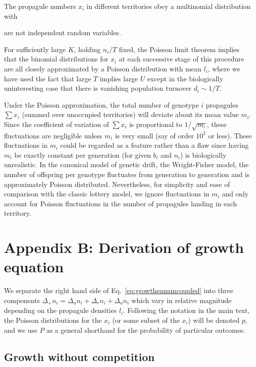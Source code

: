 \documentclass[11pt]{article}
\begin{document}
The propagule numbers $x_i$ in different territories obey a multinomial distribution with 

are not independent random variables. 



For sufficiently large $K$, holding $n_i/T$ fixed, the Poisson limit theorem implies that the binomial distributions for $x_i$ at each successive stage of this procedure are all closely approximated by a Poisson distribution with mean $l_i$, where we have used the fact that large $T$ implies large $U$ except in the biologically uninteresting case that there is vanishing population turnover $d_i \sim 1/T$. 

Under the Poisson approximation, the total number of genotype $i$ propagules $\sum x_i$ (summed over unoccupied territories) will deviate about its mean value $m_i$. Since the coefficient of variation of $\sum x_i$ is proportional to $1/\sqrt{m_i}$, these fluctuations are negligible unless $m_i$ is very small (say of order $10^2$ or less). These fluctuations in $m_i$ could be regarded as a feature rather than a flaw since having $m_i$ be exactly constant per generation (for given $b_i$ and $n_i$) is biologically unrealistic. In the canonical model of genetic drift, the Wright-Fisher model, the number of offspring per genotype fluctuates from generation to generation and is approximately Poisson distributed. Nevertheless, for simplicity and ease of comparison with the classic lottery model, we ignore fluctuations in $m_i$ and only account for Poisson fluctuations in the number of propagules landing in each territory. 

\section*{Appendix B: Derivation of growth equation}

We separate the right hand side of Eq.~\eqref{eq:growthsumuncoupled} into three components $\Delta_+ n_i = \Delta_u n_i+\Delta_r n_i+\Delta_a n_i$ which vary in relative magnitude depending on the propagule densities $l_i$. Following the notation in the main text, the Poisson distributions for the $x_i$ (or some subset of the $x_i$) will be denoted $p$, and we use $P$ as a general shorthand for the probability of particular outcomes.

\subsection*{Growth without competition}
\end{document}
